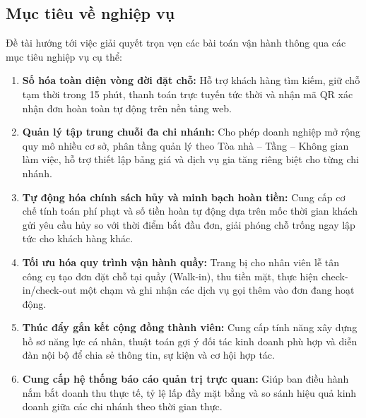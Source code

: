 \subsection{Mục tiêu về nghiệp vụ}
Đề tài hướng tới việc giải quyết trọn vẹn các bài toán vận hành thông qua các mục tiêu nghiệp vụ cụ thể:
\begin{enumerate}
    \item \textbf{Số hóa toàn diện vòng đời đặt chỗ:} Hỗ trợ khách hàng tìm kiếm, giữ chỗ tạm thời trong 15 phút, thanh toán trực tuyến tức thời và nhận mã QR xác nhận đơn hoàn toàn tự động trên nền tảng web.
    \item \textbf{Quản lý tập trung chuỗi đa chi nhánh:} Cho phép doanh nghiệp mở rộng quy mô nhiều cơ sở, phân tầng quản lý theo Tòa nhà -- Tầng -- Không gian làm việc, hỗ trợ thiết lập bảng giá và dịch vụ gia tăng riêng biệt cho từng chi nhánh.
    \item \textbf{Tự động hóa chính sách hủy và minh bạch hoàn tiền:} Cung cấp cơ chế tính toán phí phạt và số tiền hoàn tự động dựa trên mốc thời gian khách gửi yêu cầu hủy so với thời điểm bắt đầu đơn, giải phóng chỗ trống ngay lập tức cho khách hàng khác.
    \item \textbf{Tối ưu hóa quy trình vận hành quầy:} Trang bị cho nhân viên lễ tân công cụ tạo đơn đặt chỗ tại quầy (Walk-in), thu tiền mặt, thực hiện check-in/check-out một chạm và ghi nhận các dịch vụ gọi thêm vào đơn đang hoạt động.
    \item \textbf{Thúc đẩy gắn kết cộng đồng thành viên:} Cung cấp tính năng xây dựng hồ sơ năng lực cá nhân, thuật toán gợi ý đối tác kinh doanh phù hợp và diễn đàn nội bộ để chia sẻ thông tin, sự kiện và cơ hội hợp tác.
    \item \textbf{Cung cấp hệ thống báo cáo quản trị trực quan:} Giúp ban điều hành nắm bắt doanh thu thực tế, tỷ lệ lấp đầy mặt bằng và so sánh hiệu quả kinh doanh giữa các chi nhánh theo thời gian thực.
\end{enumerate}

